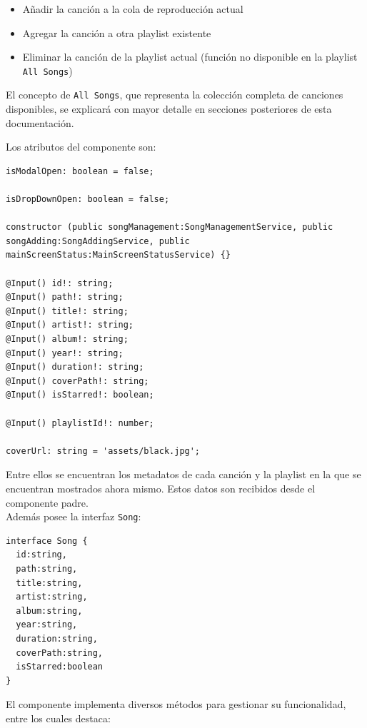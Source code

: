 \documentclass[11pt, a4paper]{article}
\begin{document}
                \begin{itemize}
                    \item Añadir la canción a la cola de reproducción actual
                    \item Agregar la canción a otra playlist existente
                    \item Eliminar la canción de la playlist actual (función no disponible en la playlist \texttt{All Songs})
                \end{itemize}

                El concepto de \texttt{All Songs}, que representa la colección completa de canciones disponibles, se explicará con mayor detalle en secciones posteriores de esta documentación.

                Los atributos del componente son:

                \begin{lstlisting}[caption={Atributos Song Button}]
isModalOpen: boolean = false;

isDropDownOpen: boolean = false;

constructor (public songManagement:SongManagementService, public songAdding:SongAddingService, public mainScreenStatus:MainScreenStatusService) {}

@Input() id!: string;
@Input() path!: string;
@Input() title!: string;
@Input() artist!: string;
@Input() album!: string;
@Input() year!: string;
@Input() duration!: string;
@Input() coverPath!: string;
@Input() isStarred!: boolean;

@Input() playlistId!: number;

coverUrl: string = 'assets/black.jpg';
                \end{lstlisting}

                Entre ellos se encuentran los metadatos de cada canción y la playlist en la que se encuentran mostrados ahora mismo. Estos datos son recibidos desde el componente padre. \\

                Además posee la interfaz \texttt{Song}:

                \begin{lstlisting}[caption={Song}]
interface Song {
  id:string,
  path:string,
  title:string,
  artist:string,
  album:string,
  year:string,
  duration:string,
  coverPath:string,
  isStarred:boolean
}
                \end{lstlisting}

                El componente implementa diversos métodos para gestionar su funcionalidad, entre los cuales destaca:
\end{document}
